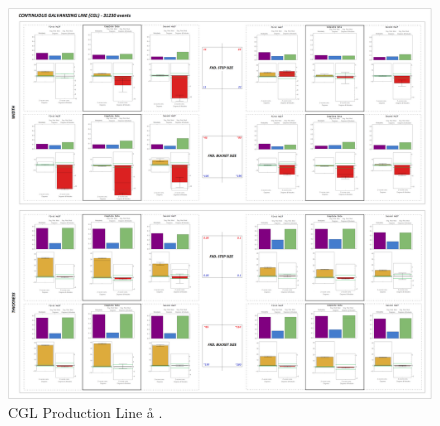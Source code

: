 \begin{landscape}
	\begin{figure}[ht]
		\centering
		\vspace*{-1.5cm}
		\captionsetup{width=1.1\linewidth}
		\includegraphics[width=1.2\textwidth]{../images/supplements-CGL_real_life_events_analysis-results.png}
		\caption{CGL Production Line \aa{} \bb{}.}
		\label{figure-supplements-CGL}
	\end{figure}
\end{landscape}